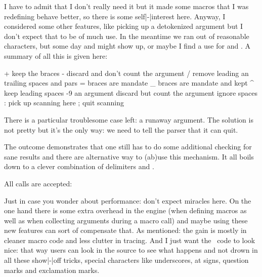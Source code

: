 \typebuffer[example][option=TEX] \startpacked \getbuffer[example] \stoppacked

I have to admit that I don't really need it but it made some macros that I was
redefining behave better, so there is some self|-|interest here. Anyway, I
considered some other features, like picking up a detokenized argument but I
don't expect that to be of much use. In the meantime we ran out of reasonable
characters, but some day  and \type {#!} might show up, or maybe I find
a use for \type {#<} and \type {#>}. A summary of all this is given here:

\starttabulate[|T|i2l|]
\FL
\NC +   \NC keep the braces \NC \NR
\NC -   \NC discard and don't count the argument \NC \NR
\NC /   \NC remove leading an trailing spaces and pars \NC \NR
\NC =   \NC braces are mandate \NC \NR
\NC _   \NC braces are mandate and kept \NC \NR
\NC ^   \NC keep leading spaces \NC \NR
\ML
{}-9 \NC an argument \NC \NR
{}   \NC discard but count the argument \NC \NR
\ML
\NC *   \NC ignore spaces \NC \NR
\NC :   \NC pick up scanning here  \NC \NR
\NC ;   \NC quit scanning \NC \NR
\LL
\stoptabulate

\stopsection

\startsection[title=Runaway arguments]

There is a particular troublesome case left: a runaway argument. The solution is
not pretty but it's the only way: we need to tell the parser that it can quit.

\startbuffer[definition]
\tolerant{}
\stopbuffer

\typebuffer[definition][option=TEX] \getbuffer[definition]

\startbuffer[example]
\dontleavehmode \foo[a=1]
\dontleavehmode \foo[b=]
\dontleavehmode \foo[=]
\dontleavehmode \foo[x]\ignorearguments
\stopbuffer

The outcome demonstrates that one still has to do some additional checking for sane
results and there are alternative way to (ab)use this mechanism. It all boils down
to a clever combination of delimiters and \type {\ignorearguments}.

\typebuffer[example][option=TEX]

All calls are accepted:

\startlines \getbuffer[example] \stoplines

Just in case you wonder about performance: don't expect miracles here. On the one
hand there is some extra overhead in the engine (when defining macros as well as
when collecting arguments during a macro call) and maybe using these new features
can sort of compensate that. As mentioned: the gain is mostly in cleaner macro
code and less clutter in tracing. And I just want the \CONTEXT\ code to look
nice: that way users can look in the source to see what happens and not drown in
all these show|-|off tricks, special characters like underscores, at signs,
question marks and exclamation marks.

